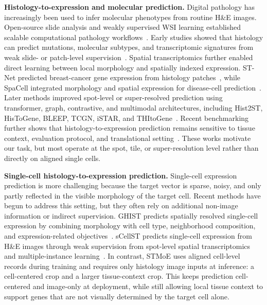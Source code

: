 \documentclass[sigconf]{acmart}
\newcommand{\method}{STMoE\xspace}
\begin{document}
\textbf{Histology-to-expression and molecular prediction.}
Digital pathology has increasingly been used to infer molecular phenotypes from routine H\&E images. Open-source slide analysis and weakly supervised WSI learning established scalable computational pathology workflows~\cite{bankhead2017qupath,campanella2019clinical,lu2021clam}. Early studies showed that histology can predict mutations, molecular subtypes, and transcriptomic signatures from weak slide- or patch-level supervision~\cite{coudray2018mutation,kather2020pancancer,pronier2020he2rna}. Spatial transcriptomics further enabled direct learning between local morphology and spatially indexed expression. ST-Net predicted breast-cancer gene expression from histology patches~\cite{he2020stnet}, while SpaCell integrated morphology and spatial expression for disease-cell prediction~\cite{tan2020spacell}. Later methods improved spot-level or super-resolved prediction using transformer, graph, contrastive, and multimodal architectures, including Hist2ST, HisToGene, BLEEP, TCGN, iSTAR, and THItoGene~\cite{zeng2022hist2st,pang2021histogene,xie2023bleep,xiao2024tcgn,zhang2024istar,jia2024thitogene,li2024ihast}. Recent benchmarking further shows that histology-to-expression prediction remains sensitive to tissue context, evaluation protocol, and translational setting~\cite{wang2025benchmark}. These works motivate our task, but most operate at the spot, tile, or super-resolution level rather than directly on aligned single cells.

\textbf{Single-cell histology-to-expression prediction.}
Single-cell expression prediction is more challenging because the target vector is sparse, noisy, and only partly reflected in the visible morphology of the target cell. Recent methods have begun to address this setting, but they often rely on additional non-image information or indirect supervision. GHIST predicts spatially resolved single-cell expression by combining morphology with cell type, neighborhood composition, and expression-related objectives~\cite{fu2025ghist}. sCellST predicts single-cell expression from H\&E images through weak supervision from spot-level spatial transcriptomics and multiple-instance learning~\cite{chadoutaud2026scellst}. In contrast, \method{} uses aligned cell-level records during training and requires only histology image inputs at inference: a cell-centered crop and a larger tissue-context crop. This keeps prediction cell-centered and image-only at deployment, while still allowing local tissue context to support genes that are not visually determined by the target cell alone.
\end{document}
